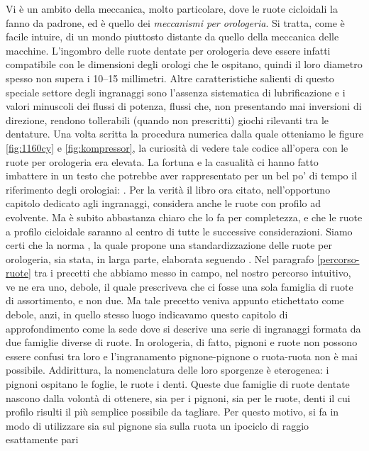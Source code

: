 \noindent Vi \`e un ambito della meccanica, molto particolare,
 dove le ruote cicloidali
la fanno da padrone, ed \`e quello dei {\em meccanismi per orologeria}.
Si tratta, come \`e facile intuire,
 di un mondo piuttosto distante da quello della meccanica delle
macchine. L'ingombro delle ruote dentate per orologeria deve essere
infatti compatibile con le dimensioni degli orologi che le ospitano,
 quindi il loro diametro
spesso non supera i 10--15 millimetri. Altre
caratteristiche
salienti di questo speciale settore degli ingranaggi sono l'assenza sistematica
di lubrificazione e i valori minuscoli dei flussi di potenza, flussi che, non
presentando mai inversioni di direzione, rendono tollerabili (quando
non prescritti) giochi rilevanti tra le dentature.
Una volta scritta la procedura numerica
dalla quale otteniamo le figure \ref{fig:1160cy} e \ref{fig:kompressor},
la curiosit\`a di vedere tale codice all'opera
con le ruote per orologeria era elevata. La 
fortuna e la casualit\`a ci hanno fatto imbattere in un testo che potrebbe
aver rappresentato per un bel po' di tempo il riferimento degli orologiai: 
\cite{grossmann}. Per la verit\`a il libro ora citato, nell'opportuno
capitolo dedicato agli ingranaggi, considera anche le ruote con profilo
ad evolvente. Ma \`e subito abbastanza chiaro che lo fa per completezza, e che
le ruote a profilo cicloidale saranno al centro di tutte le successive
considerazioni. Siamo certi che la norma \cite{bs978}, la quale propone
una standardizzazione delle ruote per orologeria, sia stata, in larga parte,
elaborata seguendo \cite{grossmann}.
Nel paragrafo \ref{percorso-ruote}
tra i precetti che abbiamo messo in campo, nel nostro percorso intuitivo,
ve ne era uno, debole, il quale prescriveva che ci fosse una sola famiglia di 
ruote di assortimento, e non due. Ma tale precetto veniva appunto 
etichettato 
come debole, anzi, in quello stesso luogo indicavamo questo capitolo
di approfondimento come la sede
dove si descrive una serie di ingranaggi formata da due famiglie 
diverse di ruote.
In orologeria, di fatto, pignoni e ruote non possono essere confusi tra loro
e l'ingranamento pignone-pignone o ruota-ruota non \`e mai 
possibile. Addirittura,
la nomenclatura delle loro sporgenze \`e eterogenea: i pignoni ospitano
le foglie, le ruote i denti. Queste due famiglie di ruote dentate nascono
dalla volont\`a di ottenere, sia per i pignoni, sia per le ruote,
denti il cui
profilo risulti il pi\`u 
semplice possibile da tagliare. Per questo motivo, si fa in modo di utilizzare
sia sul pignone sia sulla ruota un ipociclo di raggio esattamente pari
